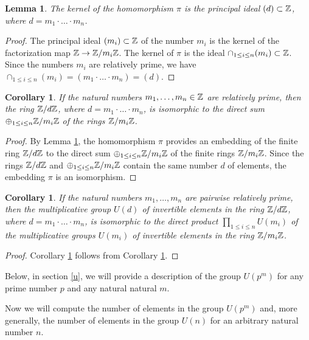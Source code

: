 \documentclass[11pt]{article}
\theoremstyle{plain}
\newtheorem{lemma}[theorem]{Lemma}
\newtheorem{corollary}[theorem]{Corollary}
\theoremstyle{definition}
\begin{document}
\begin{lemma}\label{map} The kernel of the homomorphism $\pi$ is the principal ideal $(d)\subset \Bbb Z$, where $d=m_1\cdot \ldots \cdot m_n$.
\end{lemma}

\begin{proof} The principal  ideal $(m_i)\subset \Bbb Z$ of the number $m_i$ is the kernel of the factorization map $\Bbb Z\to \Bbb Z/ m_i \Bbb Z$. The kernel of $\pi$ is the ideal $\cap_{1\leq i\leq n} (m_i)\subset \Bbb Z$. Since the numbers $m_i$ are relatively prime, we have
$\cap_{1\leq i\leq n} (m_i)=(m_1\cdot \ldots \cdot m_n)=(d)$.
\end{proof}

\begin{corollary}\label{ringiso} If the natural numbers $m_1,\dots,m_n\in \Bbb Z$ are relatively prime, then the ring $\Bbb Z/ d \Bbb Z$, where $d=m_1\cdot \ldots \cdot m_n$, is isomorphic  to the direct sum $\oplus_{1\leq i\leq n} \Bbb Z/ m_i \Bbb Z$ of the rings $\Bbb Z/m_i \Bbb Z$.
\end{corollary}

\begin{proof} By Lemma \ref{map}, the homomorphism $\pi$ provides an embedding of the finite ring $\Bbb Z/d \Bbb Z$ to the direct sum $\oplus_{1\leq i\leq n} \Bbb Z/ m_i \Bbb Z$ of the finite rings $\Bbb Z/m_i \Bbb Z$. Since the rings $\Bbb Z/d \Bbb Z$ and $\oplus_{1\leq i\leq n} \Bbb Z/ m_i \Bbb Z$  contain the same number $d$ of elements, the embedding  $\pi$ is an isomorphism.
\end{proof}

\begin{corollary}\label{invert} If the natural numbers $m_1,\dots,m_n$ are  pairwise relatively prime, then  the multiplicative group $U(d)$ of invertible elements in the ring $\Bbb Z/ d \Bbb Z$, where $d=m_1\cdot \ldots \cdot m_n$, is isomorphic  to the direct product $\prod_{1\leq i \leq n} U(m_i)$ of the multiplicative groups $U(m_i)$ of invertible elements in the ring $\Bbb Z/ m_i \Bbb Z$.
\end{corollary}
\begin{proof} Corollary \ref{invert} follows from Corollary \ref{ringiso}.
\end{proof}

Below, in section \ref{u}, we will provide a description of the  group $U(p^m)$ for any prime number $p$ and any natural natural $m$.

 Now we will compute the number of elements in the group $U(p^m)$ and, more generally, the number of elements  in the group $U(n)$ for an arbitrary natural number $n$.
\end{document}
